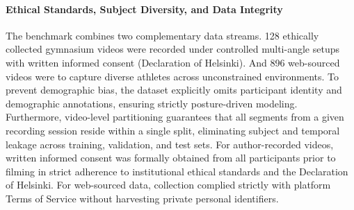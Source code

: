 \documentclass[preprint,12pt]{elsarticle}
\begin{document}
\paragraph{Ethical Standards, Subject Diversity, and Data Integrity}
The benchmark combines two complementary data streams. 128 ethically collected gymnasium videos were recorded under controlled multi-angle setups with written informed consent (Declaration of Helsinki). 
And 896 web-sourced videos were to capture diverse athletes across unconstrained environments. 
To prevent demographic bias, the dataset explicitly omits participant identity and demographic annotations, ensuring strictly posture-driven modeling. 
Furthermore, video-level partitioning guarantees that all segments from a given recording session reside within a single split, eliminating subject and temporal leakage across training, validation, and test sets.
For author-recorded videos, written informed consent was formally obtained from all participants prior to filming in strict adherence to institutional ethical standards and the Declaration of Helsinki. For web-sourced data, collection complied strictly with platform Terms of Service without harvesting private personal identifiers.
\end{document}
